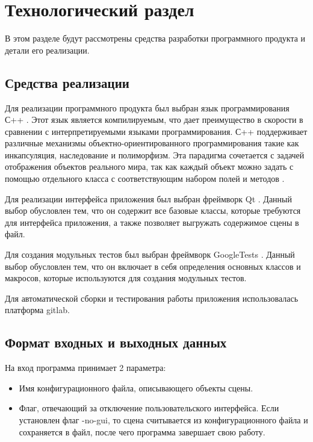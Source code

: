 \chapter{Технологический раздел}

В этом разделе будут рассмотрены средства разработки программного продукта и детали его реализации.

\section{Средства реализации}

Для реализации программного продукта был выбран язык программирования С++ \cite{cpp}. Этот язык является компилируемым, что дает преимущество в скорости в сравнении с интерпретируемыми языками программирования. С++ поддерживает различные механизмы объектно-ориентированного программирования такие как инкапсуляция, наследование и полиморфизм. Эта парадигма сочетается с задачей отображения объектов реального мира, так как каждый объект можно задать с помощью отдельного класса с соответствующим набором полей и методов \cite{oop}.

Для реализации интерфейса приложения был выбран фреймворк Qt \cite{qt}. Данный выбор обусловлен тем, что он содержит все базовые классы, которые требуются для интерфейса приложения, а также позволяет выгружать содержимое сцены в файл.

Для создания модульных тестов был выбран фреймворк GoogleTests \cite{gtest}. Данный выбор обусловлен тем, что он включает в себя определения основных классов и макросов, которые используются для создания модульных тестов.

Для автоматической сборки и тестирования работы приложения использовалась платформа gitlab.

\section{Формат входных и выходных данных}

На вход программа принимает 2 параметра:
\begin{itemize}
	\item Имя конфигурационного файла, описывающего объекты сцены.
	\item Флаг, отвечающий за отключение пользовательского интерфейса. Если установлен флаг -no-gui, то сцена считывается из конфигурационного файла и сохраняется в файл, после чего программа завершает свою работу.
\end{itemize}


